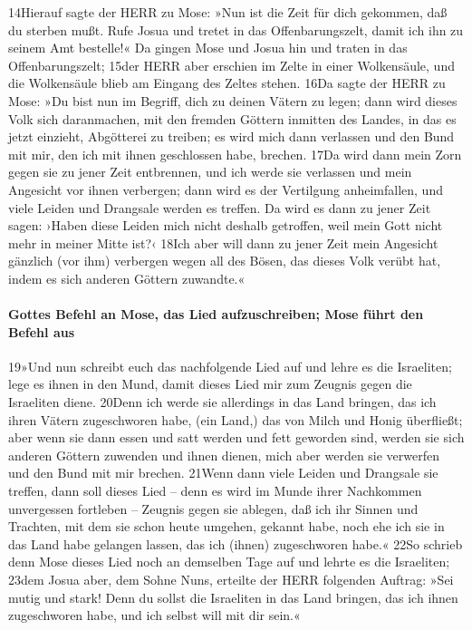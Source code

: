 14Hierauf sagte der HERR zu Mose: »Nun ist die Zeit für dich gekommen,
daß du sterben mußt. Rufe Josua und tretet in das Offenbarungszelt,
damit ich ihn zu seinem Amt bestelle!« Da gingen Mose und Josua hin und
traten in das Offenbarungszelt; 15der HERR aber erschien im Zelte in
einer Wolkensäule, und die Wolkensäule blieb am Eingang des Zeltes
stehen. 16Da sagte der HERR zu Mose: »Du bist nun im Begriff, dich zu
deinen Vätern zu legen; dann wird dieses Volk sich daranmachen, mit den
fremden Göttern inmitten des Landes, in das es jetzt einzieht,
Abgötterei zu treiben; es wird mich dann verlassen und den Bund mit mir,
den ich mit ihnen geschlossen habe, brechen. 17Da wird dann mein Zorn
gegen sie zu jener Zeit entbrennen, und ich werde sie verlassen und mein
Angesicht vor ihnen verbergen; dann wird es der Vertilgung anheimfallen,
und viele Leiden und Drangsale werden es treffen. Da wird es dann zu
jener Zeit sagen: ›Haben diese Leiden mich nicht deshalb getroffen, weil
mein Gott nicht mehr in meiner Mitte ist?‹ 18Ich aber will dann zu jener
Zeit mein Angesicht gänzlich (vor ihm) verbergen wegen all des Bösen,
das dieses Volk verübt hat, indem es sich anderen Göttern zuwandte.«

\hypertarget{gottes-befehl-an-mose-das-lied-aufzuschreiben-mose-fuxfchrt-den-befehl-aus}{%
\paragraph{Gottes Befehl an Mose, das Lied aufzuschreiben; Mose führt
den Befehl
aus}\label{gottes-befehl-an-mose-das-lied-aufzuschreiben-mose-fuxfchrt-den-befehl-aus}}

19»Und nun schreibt euch das nachfolgende Lied auf und lehre es die
Israeliten; lege es ihnen in den Mund, damit dieses Lied mir zum Zeugnis
gegen die Israeliten diene. 20Denn ich werde sie allerdings in das Land
bringen, das ich ihren Vätern zugeschworen habe, (ein Land,) das von
Milch und Honig überfließt; aber wenn sie dann essen und satt werden und
fett geworden sind, werden sie sich anderen Göttern zuwenden und ihnen
dienen, mich aber werden sie verwerfen und den Bund mit mir brechen.
21Wenn dann viele Leiden und Drangsale sie treffen, dann soll dieses
Lied -- denn es wird im Munde ihrer Nachkommen unvergessen fortleben --
Zeugnis gegen sie ablegen, daß ich ihr Sinnen und Trachten, mit dem sie
schon heute umgehen, gekannt habe, noch ehe ich sie in das Land habe
gelangen lassen, das ich (ihnen) zugeschworen habe.« 22So schrieb denn
Mose dieses Lied noch an demselben Tage auf und lehrte es die
Israeliten; 23dem Josua aber, dem Sohne Nuns, erteilte der HERR
folgenden Auftrag: »Sei mutig und stark! Denn du sollst die Israeliten
in das Land bringen, das ich ihnen zugeschworen habe, und ich selbst
will mit dir sein.«


